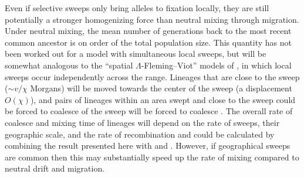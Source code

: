 \documentclass{article}
\begin{document}




Even if selective sweeps only bring alleles to fixation locally,
they are still potentially a stronger homogenizing force
than neutral mixing through migration.
Under neutral mixing, the mean number of generations back to the most recent common ancestor
is on order of the total population size.
This quantity has not been worked out for a model with simultaneous local sweeps,
but will be somewhat analogous to the ``spatial $\Lambda$-Fleming--Viot'' models of \citet{barton2013modelling},
in which local sweeps occur independently across the range.
Lineages that are close to the sweep ($\sim v/\chi$ Morgans) will be moved
towards the center of the sweep (a displacement $O(\chi)$), and pairs
of lineages within an area swept and close to the sweep could be
forced to coalesce  of the sweep will be forced to
coalesce \citep[see ][for work on geographic hitchhiking]{barton2013genetic}. The overall rate of coalesce and
mixing time of lineages will depend on the rate of sweeps, their
geographic scale, and the rate of recombination and could be calculated by combining the result presented here with
\citet{barton2013modelling} and  \citep{barton2013genetic}. 
However, if geographical sweeps are common
then this may substantially speed up the rate of mixing compared to
neutral drift and migration. 
\end{document}

